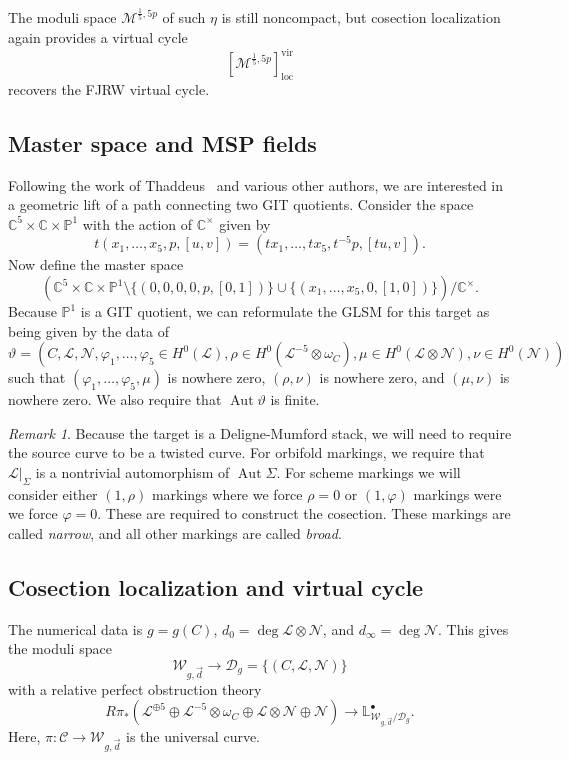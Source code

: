 \documentclass[10pt]{amsart}
\theoremstyle{definition}
\theoremstyle{remark}
\newtheorem{rmk}[thm]{Remark}
\theoremstyle{plain}
\theoremstyle{definition}
\theoremstyle{remark}
\newcommand{\C}{\mathbb{C}}
\renewcommand{\L}{\mathbb{L}}
\renewcommand{\P}{\mathbb{P}}
\newcommand{\M}{\mathcal{M}}
\newcommand{\mc}[1]{\mathcal{#1}}
\newcommand{\mr}[1]{\mathrm{#1}}
\newcommand{\on}[1]{\operatorname{#1}}
\newcommand{\1}{\mathbf{1}}
\newcommand{\2}{\mathbf{2}}
\newcommand{\3}{\mathbf{3}}
\newcommand{\vir}{\mr{vir}}
\DeclareMathOperator{\Aut}{Aut}
\begin{document}
The moduli space $\M^{\frac{1}{5},5p}$ of such $\eta$ is still noncompact, but cosection localization again provides a virtual cycle
\[ [\M^{\frac{1}{5},5p}]^{\vir}_{\on{loc}} \]
recovers the FJRW virtual cycle.

\subsection{Master space and MSP fields}%
\label{sub:Master space}

Following the work of Thaddeus~\cite{gitflips} and various other authors, we are interested in a geometric lift of a path connecting two GIT quotients. Consider the space $\C^5 \times \C \times \P^1$ with the action of $\C^{\times}$ given by
\[ t(x_1, \ldots, x_5, p, [u,v]) = (t x_1, \ldots, t x_5, t^{-5}p, [tu,v]). \]
Now define the master space
\[ (\C^5 \times \C \times \P^1 \setminus \{(0,0,0,0,p,[0,1])\} \cup \{(x_1,\ldots,x_5,0,[1,0])\}) / \C^{\times}. \]
Because $\P^1$ is a GIT quotient, we can reformulate the GLSM for this target as being given by the data of
\[\vartheta =  (C, \mc{L}, \mc{N}, \varphi_1, \ldots, \varphi_5 \in H^0(\mc{L}), \rho \in H^0(\mc{L}^{-5} \otimes \omega_C), \mu \in H^0(\mc{L} \otimes \mc{N}), \nu \in H^0(\mc{N})) \]
such that $(\varphi_1, \ldots, \varphi_5, \mu)$ is nowhere zero, $(\rho, \nu)$ is nowhere zero, and $(\mu, \nu)$ is nowhere zero. We also require that $\Aut \vartheta$ is finite.

\begin{rmk}
    Because the target is a Deligne-Mumford stack, we will need to require the source curve to be a twisted curve. For orbifold markings, we require that $\mc{L}|_{\Sigma}$ is a nontrivial automorphism of $\Aut \Sigma$. For scheme markings we will consider either $(1,\rho)$ markings where we force $\rho = 0$ or $(1,\varphi)$ markings were we force $\varphi = 0$. These are required to construct the cosection. These markings are called \textit{narrow}, and all other markings are called \textit{broad}.
\end{rmk}

\subsection{Cosection localization and virtual cycle}%
\label{sub:Cosection localization and virtual cycle}

The numerical data is $g = g(C)$, $d_0 = \deg \mc{L} \otimes \mc{N}$, and $d_{\infty} = \deg \mc{N}$. This gives the moduli space
\[ \mc{W}_{g,\vec{d}} \to \mc{D}_g = \{(C, \mc{L}, \mc{N})\} \]
with a relative perfect obstruction theory
\[ R \pi_* (\mc{L}^{\oplus 5} \oplus \mc{L}^{-5}\otimes \omega_C \oplus \mc{L} \otimes \mc{N} \oplus \mc{N}) \to \L^{\bullet}_{\mc{W}_{g,\vec{d}}/\mc{D}_g}. \]
Here, $\pi \colon \mc{C} \to \mc{W}_{g,\vec{d}}$ is the universal curve.
\end{document}
